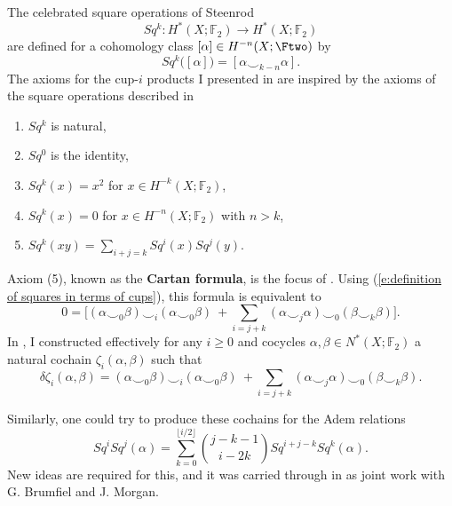 The celebrated square operations of Steenrod
\begin{equation*}
Sq^k \colon H^*(X; \mathbb F_2) \to H^*(X; \mathbb F_2)
\end{equation*}
are defined for a cohomology class $[\alpha] \in H^{-n}(X;\Ftwo)$ by
\begin{equation} \label{e:definition of squares in terms of cups}
Sq^k\big([\alpha]\big) = [\alpha \smallsmile_{k-n} \alpha].
\end{equation}
The axioms for the cup-$i$ products I presented in \cite{medina2018axiomatic} are inspired by the axioms of the square operations described in \cite{steenrod1962cohomology}
\begin{enumerate}
	\item $Sq^k$ is natural,
	\item $Sq^0$ is the identity,
	\item $Sq^k(x) = x^2$ for $x \in H^{-k}(X; \mathbb F_2)$,
	\item $Sq^k(x) = 0$ for $x \in H^{-n}(X; \mathbb F_2)$ with $n>k$,
	\item $Sq^k(xy) = \sum_{i+j=k} Sq^i (x) Sq^j(y)$.
\end{enumerate}
Axiom (5), known as the \textbf{Cartan formula}, is the focus of \cite{medina2020cartan}.
Using (\ref{e:definition of squares in terms of cups}), this formula is equivalent to
\begin{equation*}
0 =
\Big[ (\alpha \smallsmile_0 \beta) \smallsmile_i (\alpha \smallsmile_0 \beta)\ +
\sum_{i=j+k} (\alpha \smallsmile_j \alpha) \smallsmile_0 (\beta \smallsmile_k \beta) \Big].
\end{equation*}
In \cite{medina2020cartan}, I constructed effectively for any $i \geq 0$ and cocycles $\alpha, \beta \in N^*(X; \mathbb F_2)$ a natural cochain $\zeta_i(\alpha, \beta)$ such that
\begin{equation*}
\delta \zeta_i(\alpha, \beta) =
(\alpha \smallsmile_0 \beta) \smallsmile_i (\alpha \smallsmile_0 \beta)\ + \sum_{i=j+k} (\alpha \smallsmile_j \alpha) \smallsmile_0 (\beta \smallsmile_k \beta).
\end{equation*}

Similarly, one could try to produce these cochains for the Adem relations
\begin{equation*}
Sq^i Sq^j(\alpha) = \sum_{k=0}^{\lfloor i/2 \rfloor} {j-k-1 \choose i-2k} Sq^{i+j-k} Sq^k(\alpha).
\end{equation*}
New ideas are required for this, and it was carried through in \cite{medina2021adem} as joint work with G. Brumfiel and J. Morgan.

